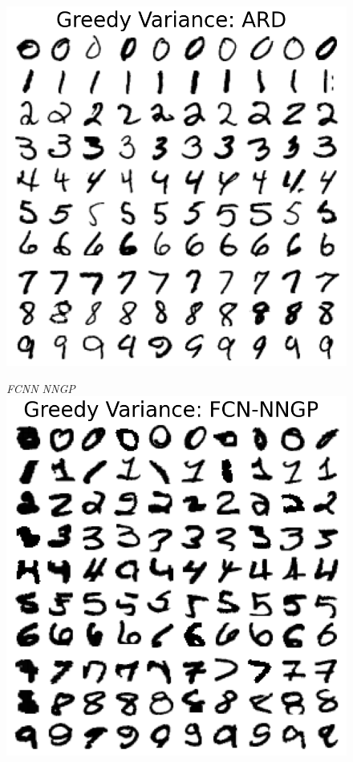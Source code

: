 \documentclass{article}
\numberwithin{equation}{section}
\begin{document}
\begin{figure}[h!]
\begin{minipage}{.25\textwidth}
  \includegraphics[width=\linewidth, trim={0 0 0 1.5cm},clip]{thesis_report/figures/mnist_inducing_point/greedy_mnist_ard_inducing_point_selection.png}
\end{minipage}%
\begin{minipage}{.25\textwidth}
  \centering
  \textit{FCNN NNGP}
  \includegraphics[width=\linewidth, trim={0 0 0 1.5cm},clip]{thesis_report/figures/mnist_inducing_point/greedy_mnist_fcn_nngp_inducing_point_selection.png}

\end{minipage}
\end{figure}
\end{document}
